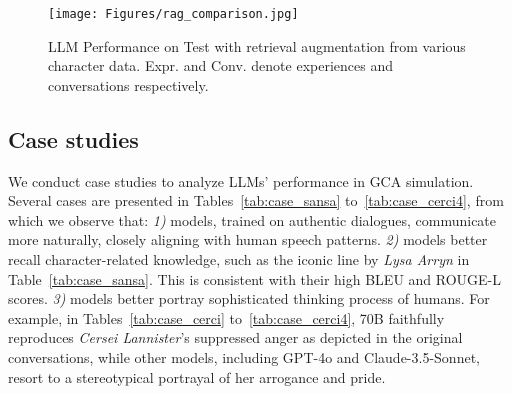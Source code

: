 \begin{figure}[t]
    \centering
    \texttt{[image: Figures/rag\_comparison.jpg]}
    \caption{LLM Performance on \method Test 
    with retrieval augmentation from various character data. 
    Expr. and Conv. denote experiences and conversations respectively.  
    }
    \label{fig:distribution}
\end{figure}


\subsection{Case studies}

  
We conduct case studies to analyze LLMs' performance in GCA simulation. 
Several cases are presented in Tables~\ref{tab:case_sansa} to~\ref{tab:case_cerci4}, from which we observe that:
\textit{1)} \method models, trained on authentic dialogues, communicate more naturally, closely aligning with human speech patterns.
\textit{2)} \method models better recall character-related knowledge, such as the iconic line \textit{} by \textit{Lysa Arryn} in Table~\ref{tab:case_sansa}.
This is consistent with their high BLEU and ROUGE-L scores.
\textit{3)} \method models better portray sophisticated thinking process of humans. 
For example, in Tables~\ref{tab:case_cerci} to~\ref{tab:case_cerci4}, 
\method 70B faithfully reproduces \textit{Cersei Lannister}’s suppressed anger as depicted in the original conversations, while other models, including GPT-4o and Claude-3.5-Sonnet, resort to a stereotypical portrayal of her arrogance and pride.
